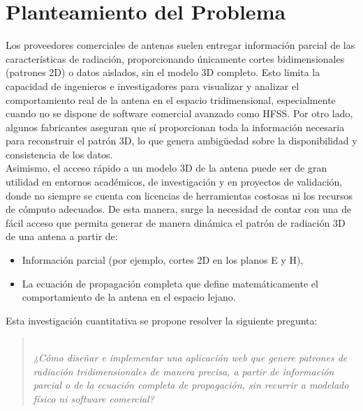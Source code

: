 \section{Planteamiento del Problema}
Los proveedores comerciales de antenas suelen entregar información parcial de las características de radiación, proporcionando únicamente cortes bidimensionales (patrones 2D) o datos aislados, sin el modelo 3D completo. Esto limita la capacidad de ingenieros e investigadores para visualizar y analizar el comportamiento real de la antena en el espacio tridimensional, especialmente cuando no se dispone de software comercial avanzado como HFSS. Por otro lado, algunos fabricantes aseguran que sí proporcionan toda la información necesaria para reconstruir el patrón 3D, lo que genera ambigüedad sobre la disponibilidad y consistencia de los datos. 
\\
Asimismo, el acceso rápido a un modelo 3D de la antena puede ser de gran utilidad en entornos académicos, de investigación y en proyectos de validación, donde no siempre se cuenta con licencias de herramientas costosas ni los recursos de cómputo adecuados. De esta manera, surge la necesidad de contar con una de fácil acceso que permita generar de manera dinámica el patrón de radiación 3D de una antena a partir de: 
\begin{itemize}
  \item Información parcial (por ejemplo, cortes 2D en los planos E y H), 
  \item La ecuación de propagación completa que define matemáticamente el comportamiento de la antena en el espacio lejano.
\end{itemize}

Esta investigación cuantitativa se propone resolver la siguiente pregunta:
\begin{quotation}
  \textit{\\¿Cómo diseñar e implementar una aplicación web que genere patrones de radiación tridimensionales de manera precisa, a partir de información parcial o de la ecuación completa de propagación, sin recurrir a modelado físico ni software comercial?}
\end{quotation}